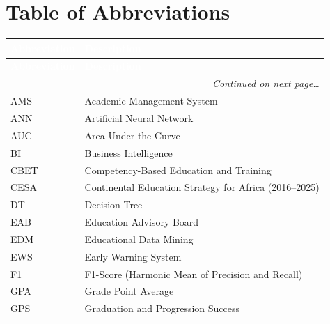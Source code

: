 \documentclass[12pt]{report}
\begin{document}
\chapter*{Table of Abbreviations}

\vspace{0.5em}
\begin{center}
\begin{longtable}{|p{3.2cm}|p{10.5cm}|}
\hline
\rowcolor{tableheader}
\textcolor{white}{\textbf{Abbreviation}} &
\textcolor{white}{\textbf{Description}} \\ \hline
\endfirsthead
\hline
\rowcolor{tableheader}
\textcolor{white}{\textbf{Abbreviation}} &
\textcolor{white}{\textbf{Description}} \\ \hline
\endhead
\hline
\multicolumn{2}{|r|}{\small\textit{Continued on next page\ldots}} \\
\endfoot
\hline
\endlastfoot
\rowcolor{tablerowlight} AMS     & Academic Management System \\ \hline
\rowcolor{tablerowwhite} ANN     & Artificial Neural Network \\ \hline
\rowcolor{tablerowlight} AUC     & Area Under the Curve \\ \hline
\rowcolor{tablerowwhite} BI      & Business Intelligence \\ \hline
\rowcolor{tablerowlight} CBET    & Competency-Based Education and Training \\ \hline
\rowcolor{tablerowwhite} CESA    & Continental Education Strategy for Africa (2016--2025) \\ \hline
\rowcolor{tablerowlight} DT      & Decision Tree \\ \hline
\rowcolor{tablerowwhite} EAB     & Education Advisory Board \\ \hline
\rowcolor{tablerowlight} EDM     & Educational Data Mining \\ \hline
\rowcolor{tablerowwhite} EWS     & Early Warning System \\ \hline
\rowcolor{tablerowlight} F1      & F1-Score (Harmonic Mean of Precision and Recall) \\ \hline
\rowcolor{tablerowwhite} GPA     & Grade Point Average \\ \hline
\rowcolor{tablerowlight} GPS     & Graduation and Progression Success \\ \hline

\end{longtable}
\end{center}
\end{document}
